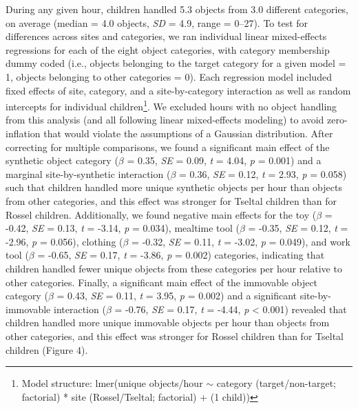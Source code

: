 \documentclass[10pt, letterpaper]{article}
\begin{document}
During any given hour, children handled 5.3 objects from 3.0 different
categories, on average (median = 4.0 objects, \emph{SD} = 4.9, range =
0--27). To test for differences across sites and categories, we ran
individual linear mixed-effects regressions for each of the eight object
categories, with category membership dummy coded (i.e., objects
belonging to the target category for a given model = 1, objects
belonging to other categories = 0). Each regression model included fixed
effects of site, category, and a site-by-category interaction as well as
random intercepts for individual children\footnote{Model structure:
  lmer(unique objects/hour \({\sim}\) category (target/non-target;
  factorial) * site (Rossel/Tseltal; factorial) + (1 \textbar{} child))}.
We excluded hours with no object handling from this analysis (and all
following linear mixed-effects modeling) to avoid zero-inflation that
would violate the assumptions of a Gaussian distribution. After
correcting for multiple comparisons, we found a significant main effect
of the synthetic object category (\(\beta\) = 0.35, \emph{SE} = 0.09,
\emph{t} = 4.04, \emph{p} = 0.001) and a marginal site-by-synthetic
interaction (\(\beta\) = 0.36, \emph{SE} = 0.12, \emph{t} = 2.93,
\emph{p} = 0.058) such that children handled more unique synthetic
objects per hour than objects from other categories, and this effect was
stronger for Tseltal children than for Rossel children. Additionally, we
found negative main effects for the toy (\(\beta\) = -0.42, \emph{SE} =
0.13, \emph{t} = -3.14, \emph{p} = 0.034), mealtime tool (\(\beta\) =
-0.35, \emph{SE} = 0.12, \emph{t} = -2.96, \emph{p} = 0.056), clothing
(\(\beta\) = -0.32, \emph{SE} = 0.11, \emph{t} = -3.02, \emph{p} =
0.049), and work tool (\(\beta\) = -0.65, \emph{SE} = 0.17, \emph{t} =
-3.86, \emph{p} = 0.002) categories, indicating that children handled
fewer unique objects from these categories per hour relative to other
categories. Finally, a significant main effect of the immovable object
category (\(\beta\) = 0.43, \emph{SE} = 0.11, \emph{t} = 3.95, \emph{p}
= 0.002) and a significant site-by-immovable interaction (\(\beta\) =
-0.76, \emph{SE} = 0.17, \emph{t} = -4.44, \emph{p} \textless{} 0.001)
revealed that children handled more unique immovable objects per hour
than objects from other categories, and this effect was stronger for
Rossel children than for Tseltal children (Figure 4).
\end{document}
